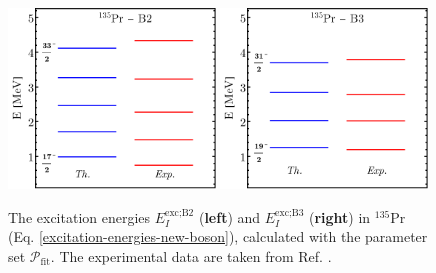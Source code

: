 \begin{figure}[b] %
    \centering
    \includegraphics[width=0.49\textwidth]{Chapters/Figures/135Pr-New-Boson-Band2-Energies.pdf}
    \includegraphics[width=0.49\textwidth]{Chapters/Figures/135Pr-New-Boson-Band3-Energies.pdf}
    \caption{The excitation energies $E_I^\text{exc;B2}$ (\textbf{left}) and $E_I^\text{exc;B3}$ (\textbf{right}) in $^{135}$Pr (Eq. \ref{excitation-energies-new-boson}), calculated with the parameter set $\mathcal{P}_\text{fit}$. The experimental data are taken from Ref. \cite{sensharma2019two}.}
    \label{135pr-new-boson-band23}
\end{figure}

